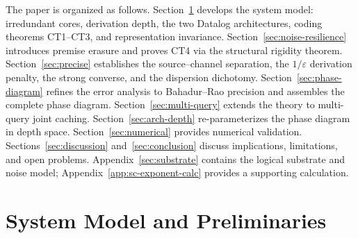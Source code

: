 \documentclass[journal]{IEEEtran}
\numberwithin{equation}{section}
\begin{document}
The paper is organized as follows.
Section~\ref{sec:model} develops the system model: irredundant cores, derivation
depth, the two Datalog architectures, coding theorems CT1--CT3, and representation
invariance.
Section~\ref{sec:noise-resilience} introduces premise erasure and proves CT4 via
the structural rigidity theorem.
Section~\ref{sec:precise} establishes the source--channel separation, the
$1/\varepsilon$ derivation penalty, the strong converse, and the dispersion
dichotomy.
Section~\ref{sec:phase-diagram} refines the error analysis to Bahadur--Rao
precision and assembles the complete phase diagram.
Section~\ref{sec:multi-query} extends the theory to multi-query joint caching.
Section~\ref{sec:arch-depth} re-parameterizes the phase diagram in depth space.
Section~\ref{sec:numerical} provides numerical validation.
Sections~\ref{sec:discussion} and~\ref{sec:conclusion} discuss implications,
limitations, and open problems.
Appendix~\ref{sec:substrate} contains the logical substrate and noise model;
Appendix~\ref{app:sc-exponent-calc} provides a supporting calculation.


\section{System Model and Preliminaries}
\label{sec:model}
\end{document}
